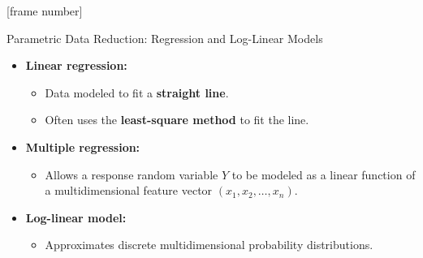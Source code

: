 \documentclass[aspectratio=169,t]{beamer}
\begin{document}
  {
    [frame number]
    \begin{frame}{Parametric Data Reduction: Regression and Log-Linear Models}
    \begin{itemize}
      \item \textbf{Linear regression:}
      \begin{itemize}
        \item Data modeled to fit a \textbf{{\color{airforceblue}straight line}}.
        \item Often uses the \textbf{{\color{airforceblue}least-square method}} to fit the line.
      \end{itemize}
      \item \textbf{Multiple regression:}
      \begin{itemize}
        \item Allows a response random variable $Y$ to be modeled as a linear function of a multidimensional feature vector $(x_1, x_2,\ldots, x_n)$.
      \end{itemize}
      \item \textbf{Log-linear model:}
      \begin{itemize}
        \item Approximates discrete multidimensional probability distributions.
      \end{itemize}
    \end{itemize}
    \end{frame}
  }
\end{document}
